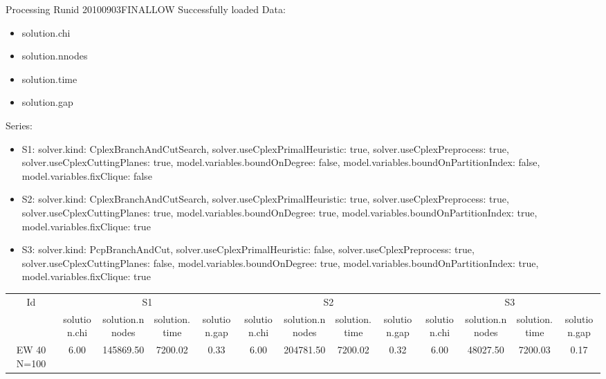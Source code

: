 \documentclass[landscape, 12pt]{report}
\begin{document}
 
Processing Runid 20100903FINALLOW
 Successfully loaded
Data:
\begin{itemize}
\item solution.chi
\item solution.nnodes
\item solution.time
\item solution.gap
\end{itemize}
Series:
\begin{itemize}
\item S1: solver.kind: CplexBranchAndCutSearch, solver.useCplexPrimalHeuristic: true, solver.useCplexPreprocess: true, solver.useCplexCuttingPlanes: true, model.variables.boundOnDegree: false, model.variables.boundOnPartitionIndex: false, model.variables.fixClique: false
\item S2: solver.kind: CplexBranchAndCutSearch, solver.useCplexPrimalHeuristic: true, solver.useCplexPreprocess: true, solver.useCplexCuttingPlanes: true, model.variables.boundOnDegree: true, model.variables.boundOnPartitionIndex: true, model.variables.fixClique: true
\item S3: solver.kind: PcpBranchAndCut, solver.useCplexPrimalHeuristic: false, solver.useCplexPreprocess: true, solver.useCplexCuttingPlanes: false, model.variables.boundOnDegree: true, model.variables.boundOnPartitionIndex: true, model.variables.fixClique: true
\end{itemize}
\begin{tabular}{|c|cccc|cccc|cccc|}
\hline
\multicolumn{1}{|c|}{Id} & \multicolumn{4}{|c|}{S1} & \multicolumn{4}{|c|}{S2} & \multicolumn{4}{|c|}{S3}
\\
 & solution.chi & solution.nnodes & solution.time & solution.gap & solution.chi & solution.nnodes & solution.time & solution.gap & solution.chi & solution.nnodes & solution.time & solution.gap
\\
\hline
EW 40 N=100 & 6.00 & 145869.50 & 7200.02 & 0.33 & 6.00 & 204781.50 & 7200.02 & 0.32 & 6.00 & 48027.50 & 7200.03 & 0.17
\\
\hline 
 \end{tabular}
 
\end{document}
